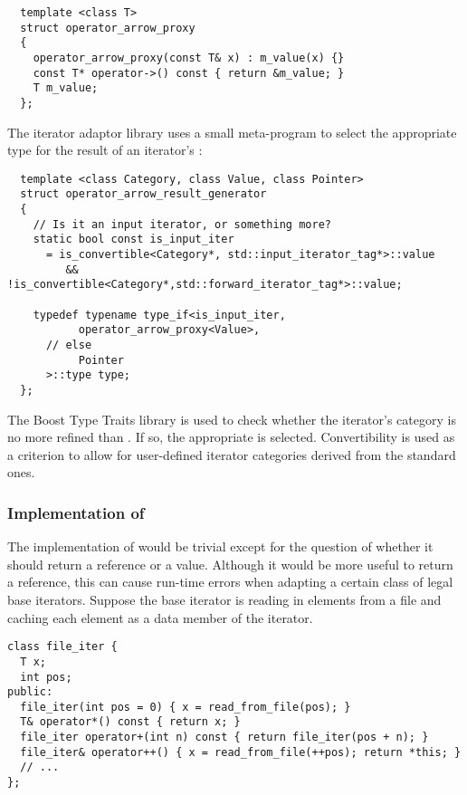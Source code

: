 \documentclass{netobjectdays}
\begin{document}
{\footnotesize
\begin{verbatim}
  template <class T>
  struct operator_arrow_proxy
  {
    operator_arrow_proxy(const T& x) : m_value(x) {}
    const T* operator->() const { return &m_value; }
    T m_value;
  };
\end{verbatim}
}

\noindent The iterator adaptor library uses a small meta-program to
select the appropriate type for the result of an iterator's
:

{\footnotesize
\begin{verbatim}
  template <class Category, class Value, class Pointer>
  struct operator_arrow_result_generator
  {
    // Is it an input iterator, or something more?
    static bool const is_input_iter
      = is_convertible<Category*, std::input_iterator_tag*>::value
         && !is_convertible<Category*,std::forward_iterator_tag*>::value;

    typedef typename type_if<is_input_iter,
           operator_arrow_proxy<Value>,
      // else
           Pointer
      >::type type;
  };
\end{verbatim}
}

The Boost Type Traits library is used to check whether the iterator's
category is no more refined than . If so,
the appropriate  is selected.
Convertibility is used as a criterion to allow for user-defined
iterator categories derived from the standard ones.


\subsubsection{Implementation of }
\label{sec:op-bracket-impl}

The implementation of  would be trivial except for
the question of whether it should return a reference or a
value. Although it would be more useful to return a reference, this
can cause run-time errors when adapting a certain class of legal base
iterators.  Suppose the base iterator is reading in elements from a
file and caching each element as a data member of the iterator.

{\footnotesize
\begin{verbatim}
class file_iter {
  T x;
  int pos;
public:
  file_iter(int pos = 0) { x = read_from_file(pos); }
  T& operator*() const { return x; }
  file_iter operator+(int n) const { return file_iter(pos + n); }
  file_iter& operator++() { x = read_from_file(++pos); return *this; }
  // ...
};
\end{verbatim}
}
\end{document}
